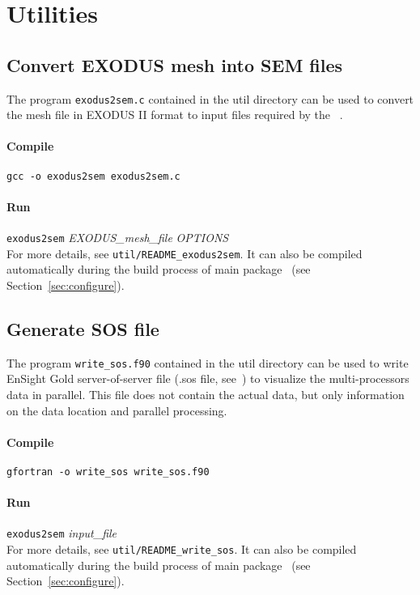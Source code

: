 \chapter{Utilities}
\label{chap:util}
\section{Convert EXODUS mesh into SEM files}

The program \texttt{exodus2sem.c} contained in the util directory can be used to convert the mesh file in EXODUS II format to input files required by the \pack\ .

\subsubsection*{Compile}
\texttt{gcc -o exodus2sem exodus2sem.c}
\subsubsection*{Run}
 \texttt{exodus2sem} {\emph{EXODUS\_mesh\_file}} {\emph{OPTIONS}}\\
 For more details, see \texttt{util/README\_exodus2sem}. It can also be compiled automatically during the build process of main package \pack\ (see Section~\ref{sec:configure}).

\section{Generate SOS file}
\label{sec:sos}

The program \texttt{write\_sos.f90} contained in the util directory can be used to write EnSight Gold server-of-server file (.sos file, see~\citep{ensight2008}) to visualize the multi-processors data in parallel. This file does not contain the actual data, but only information on the data location and parallel processing.
\subsubsection*{Compile}
\texttt{gfortran -o write\_sos write\_sos.f90}
\subsubsection*{Run}
\texttt{exodus2sem} {\it{input\_file}}\\

For more details, see \texttt{util/README\_write\_sos}. It can also be compiled automatically during the build process of main package \pack\ (see Section~\ref{sec:configure}).

